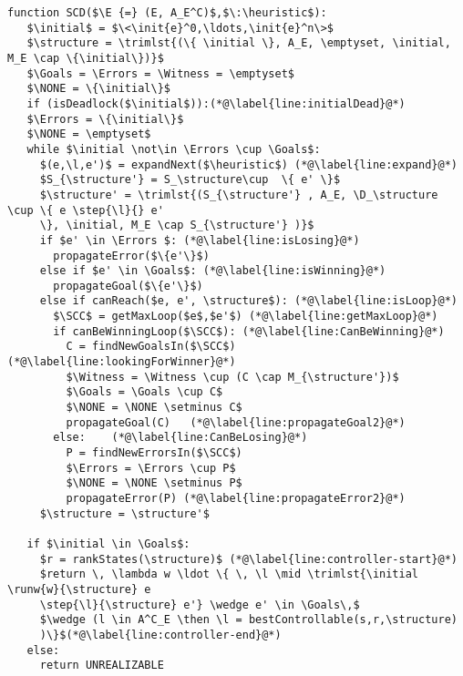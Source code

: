 \lstset{numbers=left, numberstyle=\tiny, stepnumber=1, numbersep=5pt}
\begin{lstlisting}[language={pseudocode},label={lst:dcs},caption={Algoritmo de exploración dirigida on-the-fly.},float=ht, frame=single]
 function SCD($\E {=} (E, A_E^C)$,$\:\heuristic$):
   $\initial$ = $\<\init{e}^0,\ldots,\init{e}^n\>$
   $\structure = \trimlst{(\{ \initial \}, A_E, \emptyset, \initial, M_E \cap \{\initial\})}$
   $\Goals = \Errors = \Witness = \emptyset$
   $\NONE = \{\initial\}$
   if (isDeadlock($\initial$)):(*@\label{line:initialDead}@*)
   $\Errors = \{\initial\}$
   $\NONE = \emptyset$
   while $\initial \not\in \Errors \cup \Goals$:
     $(e,\l,e')$ = expandNext($\heuristic$) (*@\label{line:expand}@*)
     $S_{\structure'} = S_\structure\cup  \{ e' \}$
     $\structure' = \trimlst{(S_{\structure'} , A_E, \D_\structure \cup \{ e \step{\l}{} e' 
     \}, \initial, M_E \cap S_{\structure'} )}$
     if $e' \in \Errors $: (*@\label{line:isLosing}@*)
       propagateError($\{e'\}$)
     else if $e' \in \Goals$: (*@\label{line:isWinning}@*)
       propagateGoal($\{e'\}$)
     else if canReach($e, e', \structure$): (*@\label{line:isLoop}@*)
       $\SCC$ = getMaxLoop($e$,$e'$) (*@\label{line:getMaxLoop}@*)
       if canBeWinningLoop($\SCC$): (*@\label{line:CanBeWinning}@*)
         C = findNewGoalsIn($\SCC$) (*@\label{line:lookingForWinner}@*)
         $\Witness = \Witness \cup (C \cap M_{\structure'})$
         $\Goals = \Goals \cup C$
         $\NONE = \NONE \setminus C$
         propagateGoal(C)   (*@\label{line:propagateGoal2}@*)
       else:    (*@\label{line:CanBeLosing}@*)
         P = findNewErrorsIn($\SCC$)
         $\Errors = \Errors \cup P$
         $\NONE = \NONE \setminus P$
         propagateError(P) (*@\label{line:propagateError2}@*)
     $\structure = \structure'$
 
   if $\initial \in \Goals$:
     $r = rankStates(\structure)$ (*@\label{line:controller-start}@*)
     $return \, \lambda w \ldot \{ \, \l \mid \trimlst{\initial \runw{w}{\structure} e 
     \step{\l}{\structure} e'} \wedge e' \in \Goals\,$
     $\wedge (l \in A^C_E \then \l = bestControllable(s,r,\structure) 
     )\}$(*@\label{line:controller-end}@*)
   else:
     return UNREALIZABLE
\end{lstlisting}  


